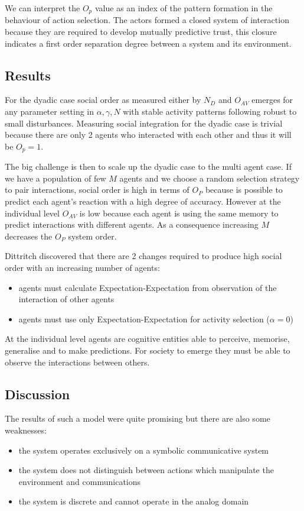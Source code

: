 We can interpret the $O_p$ value as an index of the pattern formation in
the behaviour of action selection. The actors formed a closed system of
interaction because they are required to develop mutually predictive trust,
this closure indicates a first order separation degree between a system and its environment.

\subsection{Results}
For the dyadic case social order as measured either by $N_D$ and $O_{AV}$ emerges
for any parameter setting in $\alpha,\gamma, N$ with stable activity patterns
following robust to small disturbances.
Measuring social integration for the dyadic case is trivial because there are
only 2 agents who interacted with each other and thus it will be $O_p=1$.

The big challenge is then to scale up the dyadic case to the multi agent case.
If we have a population of few $M$ agents and we choose a random selection strategy
to pair interactions,
social order is high in terms of $O_P$ because is possible to predict each agent's 
reaction with a high degree of accuracy.
However at the individual level $O_{AV}$ is low because each agent is using the
 same memory to predict interactions with different agents.
As a consequence increasing $M$ decreases the $O_P$ system order.

Dittritch discovered that there are 2 changes required to produce high social
order with an increasing number of agents:
\begin{itemize}
 \item agents must calculate Expectation-Expectation from observation of the interaction of other agents
 \item agents must use only Expectation-Expectation for activity selection ($\alpha=0$)
\end{itemize}

At the individual level agents are cognitive entities able to perceive, memorise,
generalise and to make predictions.
For society to emerge they must be able to observe the interactions between others.

\subsection{Discussion}
The results of such a model were quite promising but there are also some weaknesses:
\begin{itemize}
 \item the system operates exclusively on a symbolic communicative system
 \item the system does not distinguish between actions which manipulate the environment 
and communications 
 \item the system is discrete and cannot operate in the analog domain
\end{itemize}

